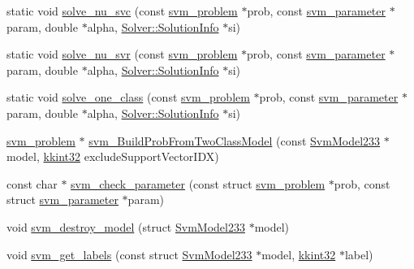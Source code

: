 \begin{DoxyCompactItemize}
\item 
static void \hyperlink{namespace_s_v_m233_a6f99fabd40e9f617abb60b6f28501d87}{solve\+\_\+nu\+\_\+svc} (const \hyperlink{struct_s_v_m233_1_1svm__problem}{svm\+\_\+problem} $\ast$prob, const \hyperlink{struct_s_v_m233_1_1svm__parameter}{svm\+\_\+parameter} $\ast$param, double $\ast$alpha, \hyperlink{struct_s_v_m233_1_1_solver_1_1_solution_info}{Solver\+::\+Solution\+Info} $\ast$si)
\item 
static void \hyperlink{namespace_s_v_m233_abf77143afa98b83194d2e1ae685ddec3}{solve\+\_\+nu\+\_\+svr} (const \hyperlink{struct_s_v_m233_1_1svm__problem}{svm\+\_\+problem} $\ast$prob, const \hyperlink{struct_s_v_m233_1_1svm__parameter}{svm\+\_\+parameter} $\ast$param, double $\ast$alpha, \hyperlink{struct_s_v_m233_1_1_solver_1_1_solution_info}{Solver\+::\+Solution\+Info} $\ast$si)
\item 
static void \hyperlink{namespace_s_v_m233_a543d7134be2bfdb7eae384b7f5eb9483}{solve\+\_\+one\+\_\+class} (const \hyperlink{struct_s_v_m233_1_1svm__problem}{svm\+\_\+problem} $\ast$prob, const \hyperlink{struct_s_v_m233_1_1svm__parameter}{svm\+\_\+parameter} $\ast$param, double $\ast$alpha, \hyperlink{struct_s_v_m233_1_1_solver_1_1_solution_info}{Solver\+::\+Solution\+Info} $\ast$si)
\item 
\hyperlink{struct_s_v_m233_1_1svm__problem}{svm\+\_\+problem} $\ast$ \hyperlink{namespace_s_v_m233_a92802c240a20c37ae50a9d0eb6f74639}{svm\+\_\+\+Build\+Prob\+From\+Two\+Class\+Model} (const \hyperlink{struct_s_v_m233_1_1_svm_model233}{Svm\+Model233} $\ast$model, \hyperlink{namespace_k_k_b_a8fa4952cc84fda1de4bec1fbdd8d5b1b}{kkint32} exclude\+Support\+Vector\+I\+DX)
\item 
const char $\ast$ \hyperlink{namespace_s_v_m233_a2f6c82c18fa59436c3f26e1ddd306820}{svm\+\_\+check\+\_\+parameter} (const struct \hyperlink{struct_s_v_m233_1_1svm__problem}{svm\+\_\+problem} $\ast$prob, const struct \hyperlink{struct_s_v_m233_1_1svm__parameter}{svm\+\_\+parameter} $\ast$param)
\item 
void \hyperlink{namespace_s_v_m233_ae4315496ae1099c8ec84268ccf7b5d14}{svm\+\_\+destroy\+\_\+model} (struct \hyperlink{struct_s_v_m233_1_1_svm_model233}{Svm\+Model233} $\ast$model)
\item 
void \hyperlink{namespace_s_v_m233_a1de1b8b1f3a654fdde252e76664ca40a}{svm\+\_\+get\+\_\+labels} (const struct \hyperlink{struct_s_v_m233_1_1_svm_model233}{Svm\+Model233} $\ast$model, \hyperlink{namespace_k_k_b_a8fa4952cc84fda1de4bec1fbdd8d5b1b}{kkint32} $\ast$label)
\item 

\end{DoxyCompactItemize}
